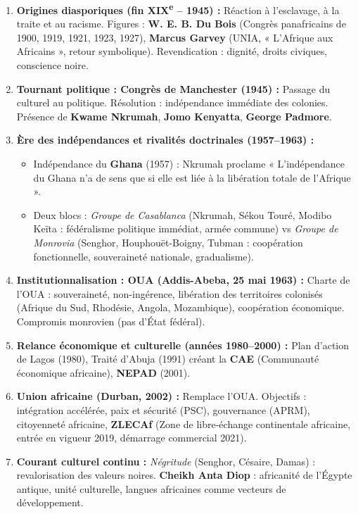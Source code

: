 \documentclass[11pt]{article}
\begin{document}
\begin{aretenir}
\begin{enumerate}
\item \textbf{Origines diasporiques (fin XIX\textsuperscript{e} -- 1945) :} Réaction à l'esclavage, à la traite et au racisme. Figures : \textbf{W. E. B. Du Bois} (Congrès panafricains de 1900, 1919, 1921, 1923, 1927), \textbf{Marcus Garvey} (UNIA, « L'Afrique aux Africains », retour symbolique). Revendication : dignité, droits civiques, conscience noire.
\item \textbf{Tournant politique : Congrès de Manchester (1945) :} Passage du culturel au politique. Résolution : indépendance immédiate des colonies. Présence de \textbf{Kwame Nkrumah}, \textbf{Jomo Kenyatta}, \textbf{George Padmore}.
\item \textbf{Ère des indépendances et rivalités doctrinales (1957--1963) :}
      \begin{itemize}
      \item Indépendance du \textbf{Ghana} (1957) : Nkrumah proclame « L'indépendance du Ghana n'a de sens que si elle est liée à la libération totale de l'Afrique ».
      \item Deux blocs : \emph{Groupe de Casablanca} (Nkrumah, Sékou Touré, Modibo Keïta : fédéralisme politique immédiat, armée commune) vs \emph{Groupe de Monrovia} (Senghor, Houphouët-Boigny, Tubman : coopération fonctionnelle, souveraineté nationale, gradualisme).
      \end{itemize}
\item \textbf{Institutionnalisation : OUA (Addis-Abeba, 25 mai 1963) :} Charte de l'OUA : souveraineté, non-ingérence, libération des territoires colonisés (Afrique du Sud, Rhodésie, Angola, Mozambique), coopération économique. Compromis monrovien (pas d'État fédéral).
\item \textbf{Relance économique et culturelle (années 1980--2000) :} Plan d'action de Lagos (1980), Traité d'Abuja (1991) créant la \textbf{CAE} (Communauté économique africaine), \textbf{NEPAD} (2001).
\item \textbf{Union africaine (Durban, 2002) :} Remplace l'OUA. Objectifs : intégration accélérée, paix et sécurité (PSC), gouvernance (APRM), citoyenneté africaine, \textbf{ZLECAf} (Zone de libre-échange continentale africaine, entrée en vigueur 2019, démarrage commercial 2021).
\item \textbf{Courant culturel continu :} \emph{Négritude} (Senghor, Césaire, Damas) : revalorisation des valeurs noires. \textbf{Cheikh Anta Diop} : africanité de l'Égypte antique, unité culturelle, langues africaines comme vecteurs de développement.
\end{enumerate}
\end{aretenir}
\end{document}
